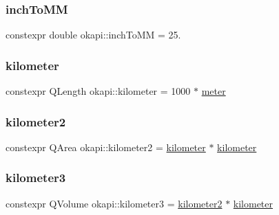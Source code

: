 \subsubsection{\texorpdfstring{inchToMM}{inchToMM}}
{\footnotesize\ttfamily constexpr double okapi\+::inch\+To\+MM = 25.\hspace{0.3cm}{\ttfamily [static]}}

\mbox{\label{namespaceokapi_a05acd5fc8bdc7fe19d03a5241ae4bbc7}} 
\subsubsection{\texorpdfstring{kilometer}{kilometer}}
{\footnotesize\ttfamily constexpr Q\+Length okapi\+::kilometer = 1000 $\ast$ \mbox{\hyperlink{namespaceokapi_a59563b3d4b18633f1c8d852e2932d1db}{meter}}}

\mbox{\label{namespaceokapi_a9760b46c22212bb946c9936f6a600455}} 
\subsubsection{\texorpdfstring{kilometer2}{kilometer2}}
{\footnotesize\ttfamily constexpr Q\+Area okapi\+::kilometer2 = \mbox{\hyperlink{namespaceokapi_a05acd5fc8bdc7fe19d03a5241ae4bbc7}{kilometer}} $\ast$ \mbox{\hyperlink{namespaceokapi_a05acd5fc8bdc7fe19d03a5241ae4bbc7}{kilometer}}}

\mbox{\label{namespaceokapi_a8d66a33d9f8e743e53655cffaac14059}} 
\subsubsection{\texorpdfstring{kilometer3}{kilometer3}}
{\footnotesize\ttfamily constexpr Q\+Volume okapi\+::kilometer3 = \mbox{\hyperlink{namespaceokapi_a9760b46c22212bb946c9936f6a600455}{kilometer2}} $\ast$ \mbox{\hyperlink{namespaceokapi_a05acd5fc8bdc7fe19d03a5241ae4bbc7}{kilometer}}}

\mbox{\label{namespaceokapi_ab3d807584cdc64b88f3d3c31fa571f9e}} 

